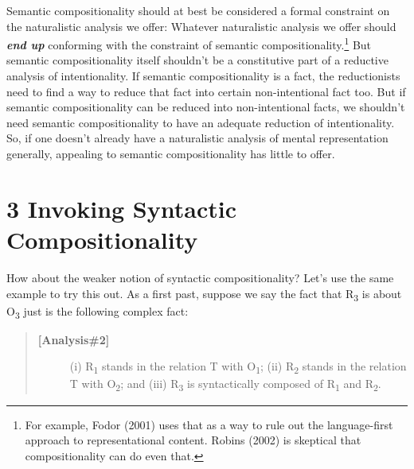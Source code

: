 \documentclass[a4paper,12pt]{article}
\begin{document}
Semantic compositionality should at best be considered a formal constraint on the naturalistic analysis we offer: Whatever naturalistic analysis we offer should \emph{\textbf{end up}} conforming with the constraint of semantic compositionality.\footnote{For example, Fodor (2001) uses that as a way to rule out the language-first approach to representational content. Robins (2002) is skeptical that compositionality can do even that.} But semantic compositionality itself shouldn't be a constitutive part of a reductive analysis of intentionality. If semantic compositionality is a fact, the reductionists need to find a way to reduce that fact into certain non-intentional fact too. But if semantic compositionality can be reduced into non-intentional facts, we shouldn't need semantic compositionality to have an adequate reduction of intentionality. So, if one doesn't already have a naturalistic analysis of mental representation generally, appealing to semantic compositionality has little to offer.\footnotemark


\section*{3 Invoking Syntactic Compositionality}

How about the weaker notion of syntactic compositionality? Let's use the same example to try this out. As a first past, suppose we say the fact that R\textsubscript{3} is about O\textsubscript{3} just is the following complex fact:

\begin{quote}
\begin{description}
\item[\textbf{[Analysis\#2]}] (i) R\textsubscript{1} stands in the relation T with O\textsubscript{1}; (ii) R\textsubscript{2} stands in the relation T with O\textsubscript{2}; and (iii) R\textsubscript{3} is syntactically composed of R\textsubscript{1} and R\textsubscript{2}.
\end{description}
\end{quote}
\end{document}
